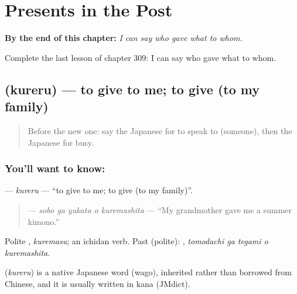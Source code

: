 
\chapter{Presents in the Post}
\label{ch:ja-presents-in-the-post}

\begin{chapteropening}
\textbf{By the end of this chapter:} \emph{I can say who gave what to whom.}

Complete the last lesson of chapter 309: I can say who gave what to whom.
\end{chapteropening}

\section[\texorpdfstring{\ja{くれる} (kureru)}{くれる (kureru)}]{ (kureru) — to give to me; to give (to my family)}

\label{lesson:JA-C309-kureru}



\begin{quote}
Before the new one: say the Japanese for to speak to (someone), then the Japanese for busy.
\end{quote}

\subsection*{You'll want to know: }
\textbf{} — \emph{kureru} — \textquotedblleft{}to give to me; to give (to my family)\textquotedblright{}.

\begin{quote}
\textbf{  } — \emph{sobo ga yukata o kuremashita} — \textquotedblleft{}My grandmother gave me a summer kimono.\textquotedblright{}
\end{quote}

Polite \textbf{}, \emph{kuremasu}; an ichidan verb. Past (polite): \textbf{  }, \emph{tomodachi ga tegami o kuremashita}.

\begin{cousinweb}
\textbf{} (\emph{kureru}) is a native Japanese word (wago), inherited rather than borrowed from Chinese, and it is usually written in kana (JMdict).
\end{cousinweb}

